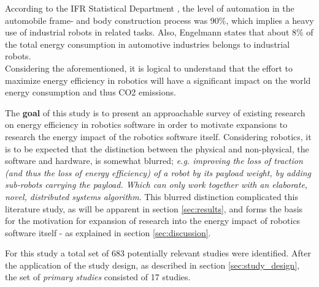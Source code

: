 According to the IFR Statistical Department \cite{IFR2010executive_summary}, the level of automation in the automobile frame- and body construction process was 90\%, which implies a heavy use of industrial robots in related tasks. 
Also, Engelmann \cite{engelmann2009energy_efficient_factories} states that about 8\% of the total energy consumption in automotive industries belongs to industrial robots. \\

Considering the aforementioned, it is logical to understand that the effort to maximize energy efficiency in robotics will have a significant impact on the world energy consumption and thus CO2 emissions.

The \textbf{goal} of this study is to present an approachable survey of existing research on energy efficiency in robotics software in order to motivate expansions to research the energy impact of the robotics software itself.
Considering robotics, it is to be expected that the distinction between the physical and non-physical, the software and hardware, is somewhat blurred; \textit{e.g. improving the loss of traction (and thus the loss of energy efficiency) of a robot by its payload weight, by adding sub-robots carrying the payload. 
Which can only work together with an elaborate, novel, distributed systems algorithm}.
This blurred distinction complicated this literature study, as will be apparent in section \ref{sec:results}, and forms the basis for the motivation for expansion of research into the energy impact of robotics software itself - as explained in section \ref{sec:discussion}.

For this study a total set of 683 potentially relevant studies were identified. After the application of the study design, as described in section \ref{sec:study_design}, the set of \textit{primary studies} consisted of 17 studies.